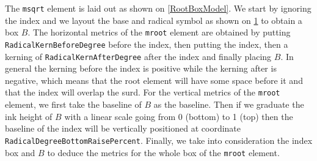 \begin{figure}
\centering
{}
\label{SquareRootBoxModel}
\end{figure}

The {\tt msqrt} element is laid out as shown on \ref{RootBoxModel}.
We start by ignoring the index and we layout the base and radical symbol as
shown on \ref{SquareRootBoxModel} to obtain a box $B$.
The horizontal metrics of the {\tt mroot} element are obtained by putting
{\tt RadicalKernBeforeDegree}
before the index, then putting the index, then a kerning
of {\tt RadicalKernAfterDegree}
after the index and finally placing $B$. In general
the kerning before the index is positive while the kerning after is negative,
which means that the root element will have some space before it and that the
index will overlap the surd.
For the vertical metrics of the {\tt mroot} element, we first take the baseline
of $B$ as the baseline. Then if we graduate the ink height of $B$ with a linear
scale going from 0 (bottom) to 1 (top) then the baseline of the index will be
vertically positioned at coordinate {\tt RadicalDegreeBottomRaisePercent}.
Finally, we take into consideration the index box and $B$ to deduce the metrics
for the whole box of the {\tt mroot} element.

